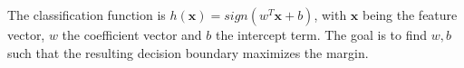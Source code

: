 The classification function is $h(\mathbf{x}) = sign(w^T\mathbf{x} + b)$, with $\mathbf{x}$ being the feature vector, $w$
the coefficient vector and $b$ the intercept term. The
goal is to find $w, b$ such that the resulting decision boundary
maximizes the margin.